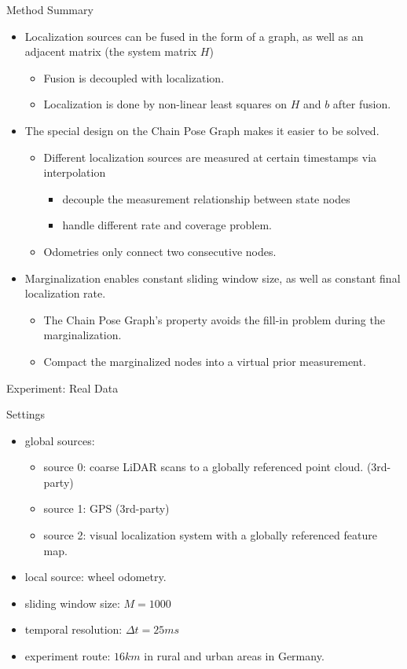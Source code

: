 \documentclass[10pt]{beamer}
\begin{document}
	\begin{frame}{Method Summary}
		\begin{itemize}
			\item<1-> Localization sources can be fused in the form of a graph, as well as an adjacent matrix (the system matrix $H$)
			\begin{itemize}
				\item Fusion is decoupled with localization.
				\item Localization is done by non-linear least squares on $H$ and $b$ after fusion. 
			\end{itemize}
			\item<2-> The special design on the Chain Pose Graph makes it easier to be solved.
			\begin{itemize}
				\item Different localization sources are measured at certain timestamps via interpolation
				\begin{itemize}
					\item decouple the measurement relationship between state nodes
					\item handle different rate and coverage problem.
				\end{itemize}
				\item Odometries only connect two consecutive nodes.
			\end{itemize}
			\item<3-> Marginalization enables constant sliding window size, as well as constant final localization rate.
			\begin{itemize}
				\item The Chain Pose Graph's property avoids the fill-in problem during the marginalization.
				\item Compact the marginalized nodes into a virtual prior measurement.
			\end{itemize}
		\end{itemize}
	\end{frame}

	\begin{frame}{Experiment: Real Data}
		\begin{block}{Settings}
			\begin{itemize}
				\item global sources:
				\begin{itemize}
					\item source 0: coarse LiDAR scans to a globally referenced point cloud. (3rd-party)
					\item source 1: GPS (3rd-party)
					\item source 2: visual localization system with a globally referenced feature map.
				\end{itemize}
				\item local source: wheel odometry.
				\item sliding window size: $M=1000$
				\item temporal resolution: $\Delta t=25ms$
				\item experiment route: $16km$ in rural and urban areas in Germany.
			\end{itemize}
		\end{block}
	\end{frame}
\end{document}
